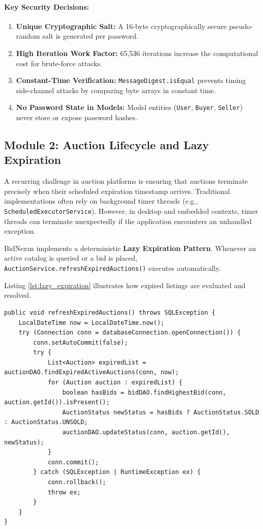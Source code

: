 \paragraph{Key Security Decisions:}
\begin{enumerate}
    \item \textbf{Unique Cryptographic Salt:} A 16-byte cryptographically secure pseudo-random salt is generated per password.
    \item \textbf{High Iteration Work Factor:} 65,536 iterations increase the computational cost for brute-force attacks.
    \item \textbf{Constant-Time Verification:} \texttt{MessageDigest.isEqual} prevents timing side-channel attacks by comparing byte arrays in constant time.
    \item \textbf{No Password State in Models:} Model entities (\texttt{User}, \texttt{Buyer}, \texttt{Seller}) never store or expose password hashes.
\end{enumerate}

\subsection{Module 2: Auction Lifecycle and Lazy Expiration}
A recurring challenge in auction platforms is ensuring that auctions terminate precisely when their scheduled expiration timestamp arrives. Traditional implementations often rely on background timer threads (e.g., \texttt{ScheduledExecutorService}). However, in desktop and embedded contexts, timer threads can terminate unexpectedly if the application encounters an unhandled exception.

BidNexus implements a deterministic \textbf{Lazy Expiration Pattern}. Whenever an active catalog is queried or a bid is placed, \texttt{AuctionService.refreshExpiredAuctions()} executes automatically.

Listing \ref{lst:lazy_expiration} illustrates how expired listings are evaluated and resolved.

\begin{lstlisting}[caption={Deterministic Lazy Expiration in \texttt{AuctionService.java}}, label={lst:lazy_expiration}]
public void refreshExpiredAuctions() throws SQLException {
    LocalDateTime now = LocalDateTime.now();
    try (Connection conn = databaseConnection.openConnection()) {
        conn.setAutoCommit(false);
        try {
            List<Auction> expiredList = auctionDAO.findExpiredActiveAuctions(conn, now);
            for (Auction auction : expiredList) {
                boolean hasBids = bidDAO.findHighestBid(conn, auction.getId()).isPresent();
                AuctionStatus newStatus = hasBids ? AuctionStatus.SOLD : AuctionStatus.UNSOLD;
                auctionDAO.updateStatus(conn, auction.getId(), newStatus);
            }
            conn.commit();
        } catch (SQLException | RuntimeException ex) {
            conn.rollback();
            throw ex;
        }
    }
}
\end{lstlisting}

